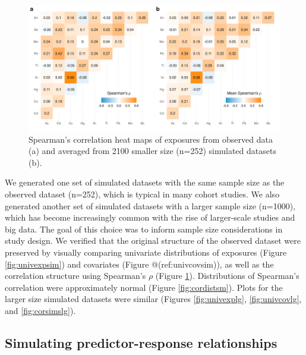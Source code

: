 \documentclass[12pt, twoside]{amherstthesis}
\begin{document}
\begin{figure}

{\centering \includegraphics[width=1\linewidth]{figures/ch4_corr_sim+orig} 

}

\caption{Spearman's correlation heat maps of exposures from observed data (a) and averaged from 2100 smaller size (n=252) simulated datasets (b).}\label{fig:corsimssm}
\end{figure}
We generated one set of simulated datasets with the same sample size as the observed dataset (n=252), which is typical in many cohort studies. We also generated another set of simulated datasets with a larger sample size (n=1000), which has become increasingly common with the rise of larger-scale studies and big data. The goal of this choice was to inform sample size considerations in study design. We verified that the original structure of the observed dataset were preserved by visually comparing univariate distributions of exposures (Figure \ref{fig:univexpsim}) and covariates (Figure @(ref:univcovsim)), as well as the correlation structure using Spearman's \(\rho\) (Figure \ref{fig:corsimssm}). Distributions of Spearman's correlation were approximately normal (Figure \ref{fig:cordistsm}). Plots for the larger size simulated datasets were similar (Figures \ref{fig:univexplg}, \ref{fig:univcovlg}, and \ref{fig:corsimslg}).

\hypertarget{simresp}{%
\subsection{Simulating predictor-response relationships}\label{simresp}}
\end{document}
